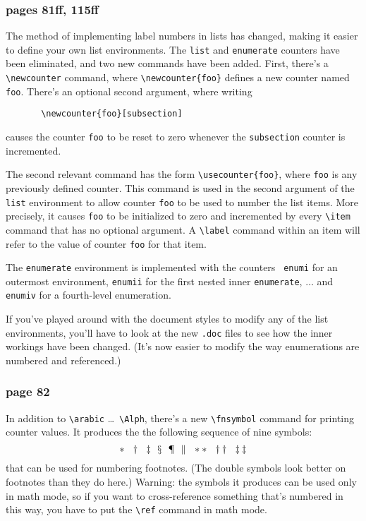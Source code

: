 \subsubsection*{pages 81ff, 115ff}
The method of implementing label numbers in lists has changed, making
it easier to define your own list environments.  The {\tt list}
and \hbox{\verb"enumerate"} counters have been eliminated, and two new
commands have been added.  First, there's a \hbox{\verb"\newcounter"}
command, where \hbox{\verb"\newcounter{foo}"} defines a new counter
named {\tt foo}.  There's an optional second argument, where writing
\begin{verbatim}
       \newcounter{foo}[subsection]
\end{verbatim}
causes the counter {\tt foo} to be reset to zero whenever the
{\tt subsection} counter is incremented.

The second relevant command has the form \hbox{\verb"\usecounter{foo}"},
where {\tt foo} is any previously defined counter.  This command is used
in the second argument of the {\tt list} environment to allow counter
{\tt foo} to be used to number the list items.  More precisely, it
causes {\tt foo} to be initialized to zero and incremented by every
\hbox{\verb"\item"} command that has no optional argument.  A 
\hbox{\verb"\label"} command within an item will refer to the value
of counter {\tt foo} for that item.

The {\tt enumerate} environment is implemented with the counters {\tt
enumi} for an outermost environment, {\tt enumii} for the first nested
inner {\tt enumerate}, $\ldots$ and {\tt enumiv} for a fourth-level
enumeration.

If you've played around with the document styles to modify any of
the list environments, you'll have to look at the new {\tt .doc} files
to see how the inner workings have been changed.  (It's now easier to
modify the way enumerations are numbered and referenced.)

\subsubsection* {page 82}
In addition to \hbox{\verb"\arabic"} \ldots\ \hbox{\verb"\Alph"},
there's a new \hbox{\verb"\fnsymbol"} command for printing counter
values.  It produces the the following sequence of nine symbols:
\[ 
* \ \ \dagger \ \ \ddagger \ \
   \mathchar "278 \ \ \mathchar "27B \ \ \| \ \ ** \ \ \dagger\dagger
   \ \ \ddagger\ddagger
 \]
that can be used for numbering footnotes.  (The double symbols look
better on footnotes than they do here.)  Warning: the symbols it
produces can be used only in math mode, so if you want to
cross-reference something that's numbered in this way, you have to put
the \hbox{\verb"\ref"} command in math mode.



